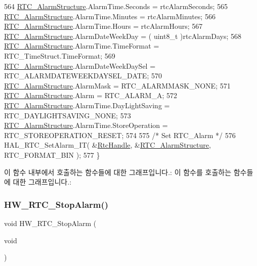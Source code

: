 \begin{DoxyCode}
564   \mbox{\hyperlink{hw__rtc_8c_aa4fc8fc521debc197e4e3becd4c532a9}{RTC\_AlarmStructure}}.AlarmTime.Seconds = rtcAlarmSeconds;
565   \mbox{\hyperlink{hw__rtc_8c_aa4fc8fc521debc197e4e3becd4c532a9}{RTC\_AlarmStructure}}.AlarmTime.Minutes = rtcAlarmMinutes;
566   \mbox{\hyperlink{hw__rtc_8c_aa4fc8fc521debc197e4e3becd4c532a9}{RTC\_AlarmStructure}}.AlarmTime.Hours   = rtcAlarmHours;
567   \mbox{\hyperlink{hw__rtc_8c_aa4fc8fc521debc197e4e3becd4c532a9}{RTC\_AlarmStructure}}.AlarmDateWeekDay    = ( uint8\_t )rtcAlarmDays;
568   \mbox{\hyperlink{hw__rtc_8c_aa4fc8fc521debc197e4e3becd4c532a9}{RTC\_AlarmStructure}}.AlarmTime.TimeFormat   = RTC\_TimeStruct.TimeFormat;
569   \mbox{\hyperlink{hw__rtc_8c_aa4fc8fc521debc197e4e3becd4c532a9}{RTC\_AlarmStructure}}.AlarmDateWeekDaySel   = RTC\_ALARMDATEWEEKDAYSEL\_DATE; 
570   \mbox{\hyperlink{hw__rtc_8c_aa4fc8fc521debc197e4e3becd4c532a9}{RTC\_AlarmStructure}}.AlarmMask       = RTC\_ALARMMASK\_NONE;
571   \mbox{\hyperlink{hw__rtc_8c_aa4fc8fc521debc197e4e3becd4c532a9}{RTC\_AlarmStructure}}.Alarm = RTC\_ALARM\_A;
572   \mbox{\hyperlink{hw__rtc_8c_aa4fc8fc521debc197e4e3becd4c532a9}{RTC\_AlarmStructure}}.AlarmTime.DayLightSaving = RTC\_DAYLIGHTSAVING\_NONE;
573   \mbox{\hyperlink{hw__rtc_8c_aa4fc8fc521debc197e4e3becd4c532a9}{RTC\_AlarmStructure}}.AlarmTime.StoreOperation = RTC\_STOREOPERATION\_RESET;
574   
575   \textcolor{comment}{/* Set RTC\_Alarm */}
576   HAL\_RTC\_SetAlarm\_IT( &\mbox{\hyperlink{hw__rtc_8c_af5a469a44a56337e00dc30b13e2bc051}{RtcHandle}}, &\mbox{\hyperlink{hw__rtc_8c_aa4fc8fc521debc197e4e3becd4c532a9}{RTC\_AlarmStructure}}, RTC\_FORMAT\_BIN );
577 \}
\end{DoxyCode}
이 함수 내부에서 호출하는 함수들에 대한 그래프입니다.\+:
이 함수를 호출하는 함수들에 대한 그래프입니다.\+:
\mbox{\label{group___lory_s_d_k___r_t_c___functions_ga227be06e4dc1332d46ff12519db183b5}} 
\subsubsection{\texorpdfstring{H\+W\+\_\+\+R\+T\+C\+\_\+\+Stop\+Alarm()}{HW\_RTC\_StopAlarm()}}
{\footnotesize\ttfamily void H\+W\+\_\+\+R\+T\+C\+\_\+\+Stop\+Alarm (\begin{DoxyParamCaption}\item[{void}]{ }\end{DoxyParamCaption})}



